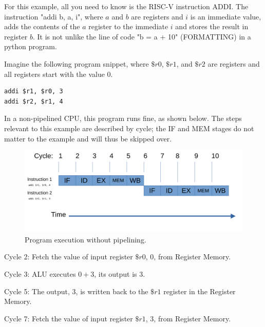 \documentclass[12pt,twoside]{reedthesis}
\begin{document}
For this example, all you need to know is the RISC-V instruction ADDI. The instruction "addi b, a, i", where $a$ and $b$ are registers and $i$ is an immediate value, adds the contents of the $a$ register to the immediate $i$ and stores the result in register $b$. It is not unlike the line of code "b = a + 10" (FORMATTING) in a python program.

Imagine the following program snippet, where $\$r0$, $\$r1$, and $\$r2$ are registers and all registers start with the value 0.

\begin{verbatim}
addi $r1, $r0, 3
addi $r2, $r1, 4
\end{verbatim}

In a non-pipelined CPU, this program runs fine, as shown below. The steps relevant to this example are described by cycle; the IF and MEM stages do not matter to the example and will thus be skipped over.


\begin{figure}[h!]

	\centering
	\includegraphics[scale=0.7]{nopipeline}
	\caption{Program execution without pipelining.}
	\label{no-pipeline}
\end{figure}

Cycle 2: Fetch the value of input register $\$r0$, $0$, from Register Memory.

Cycle 3: ALU executes $0 + 3$, its output is $3$.

Cycle 5: The output, $3$, is written back to the $\$r1$ register in the Register Memory.

Cycle 7: Fetch the value of input register $\$r1$, $3$, from Register Memory.
\end{document}
